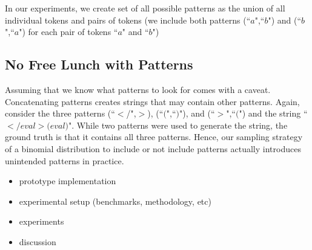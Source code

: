 In our experiments, we create set of all possible patterns as the union of all individual tokens and pairs of tokens (we include both patterns (``$a$",``$b$") and (``$b$",``$a$") for each pair of tokens ``$a$" and ``$b$")
\subsection{No Free Lunch with Patterns}
Assuming that we know what patterns to look for comes with a caveat. Concatenating patterns creates strings that may contain other patterns. Again, consider the three patterns (``$<$/",$>$), (``$($",``$)$"), and (``$>$",``$($") and the string  ``$<$$/eval$$>$$($$eval$$)$". While two patterns were used to generate the string, the ground truth is that it contains all three patterns. Hence, our sampling strategy of a binomial distribution to include or not include patterns actually introduces unintended patterns in practice. 


\begin{itemize}
	\item prototype implementation
	\item experimental setup (benchmarks, methodology, etc)
	\item experiments
	\item discussion
\end{itemize}